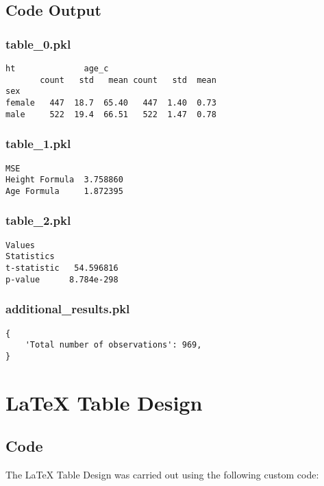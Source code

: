 \documentclass[11pt]{article}
\begin{document}
\subsection{Code Output}

\subsubsection*{table\_0.pkl}

\begin{Verbatim}[tabsize=4]
          ht              age_c
       count   std   mean count   std  mean
sex
female   447  18.7  65.40   447  1.40  0.73
male     522  19.4  66.51   522  1.47  0.78
\end{Verbatim}

\subsubsection*{table\_1.pkl}

\begin{Verbatim}[tabsize=4]
                     MSE
Height Formula  3.758860
Age Formula     1.872395
\end{Verbatim}

\subsubsection*{table\_2.pkl}

\begin{Verbatim}[tabsize=4]
                 Values
Statistics
t-statistic   54.596816
p-value      8.784e-298
\end{Verbatim}

\subsubsection*{additional\_results.pkl}

\begin{Verbatim}[tabsize=4]
{
    'Total number of observations': 969,
}
\end{Verbatim}

\section{LaTeX Table Design}
\subsection{{Code}}
The LaTeX Table Design was carried out using the following custom code:
\end{document}
